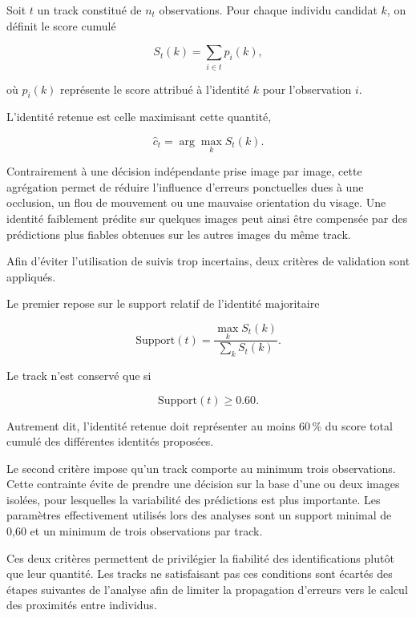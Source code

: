 \documentclass[11pt,a4paper]{report}
\begin{document}
Soit $t$ un track constitué de $n_t$ observations. Pour chaque individu
candidat $k$, on définit le score cumulé

\begin{equation}
S_t(k)
=
\sum_{i\in t}
p_i(k),
\end{equation}

où $p_i(k)$ représente le score attribué à l'identité $k$ pour l'observation
$i$.

L'identité retenue est celle maximisant cette quantité,

\begin{equation}
\widehat c_t
=
\arg\max_k S_t(k).
\end{equation}

Contrairement à une décision indépendante prise image par image, cette
agrégation permet de réduire l'influence d'erreurs ponctuelles dues à une
occlusion, un flou de mouvement ou une mauvaise orientation du visage. Une
identité faiblement prédite sur quelques images peut ainsi être compensée par
des prédictions plus fiables obtenues sur les autres images du même track.

Afin d'éviter l'utilisation de suivis trop incertains, deux critères de
validation sont appliqués.

Le premier repose sur le support relatif de l'identité majoritaire

\begin{equation}
\text{Support}(t)
=
\frac{\displaystyle
\max_k S_t(k)}
{\displaystyle
\sum_k S_t(k)}.
\end{equation}

Le track n'est conservé que si

\begin{equation}
\text{Support}(t)\geq0.60.
\end{equation}

Autrement dit, l'identité retenue doit représenter au moins 60\,\% du score
total cumulé des différentes identités proposées.

Le second critère impose qu'un track comporte au minimum trois observations.
Cette contrainte évite de prendre une décision sur la base d'une ou deux images
isolées, pour lesquelles la variabilité des prédictions est plus importante. Les
paramètres effectivement utilisés lors des analyses sont un support minimal de
0,60 et un minimum de trois observations par track. 

Ces deux critères permettent de privilégier la fiabilité des identifications
plutôt que leur quantité. Les tracks ne satisfaisant pas ces conditions sont
écartés des étapes suivantes de l'analyse afin de limiter la propagation
d'erreurs vers le calcul des proximités entre individus.
\end{document}
